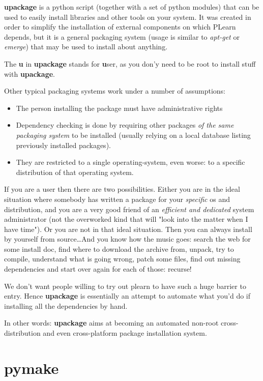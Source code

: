 \documentclass[11pt]{book}
\begin{document}
{\bf upackage} is a python script (together with a set of python modules)
that can be used to easily install libraries and other tools on your
system.  It was created in order to simplify the installation of external
components on which PLearn depends, but it is a general packaging system
(usage is similar to {\em apt-get} or {\em emerge}) that may be used to install
about anything.

The {\bf u} in {\bf upackage} stands for {\bf u}ser, as you don'y need to
  be root to install stuff with {\bf upackage}.

Other typical packaging systems work under a number of assumptions:
\begin{itemize}
\item The person installing the package must have administrative rights
\item Dependency checking is done by requiring other packages \emph{of
  the same packaging system} to be installed (usually relying on a
  local database listing previously installed packages).
\item They are restricted to a single operating-system, even worse: to a specific
  distribution of that operating system. 
\end{itemize}

If you are a user then there are two possibilities. Either you are in the
ideal situation where somebody has written a package for your {\em
specific} os and distribution, and you are a very good friend of an {\em
efficient and dedicated} system administrator (not the overworked kind that
will "look into the matter when I have time"). Or you are not in
that ideal situation. Then you can always install by yourself from
source\ldots And you know how the music goes: search the web for some
install doc, find where to download the archive from, unpack, try to
compile, understand what is going wrong, patch some files, find out missing
dependencies and start over again for each of those: recurse!

We don't want people willing to try out plearn to have such a huge barrier to
entry. Hence {\bf upackage} is essentially an attempt to automate what
you'd do if installing all the dependencies by hand.

In other words: {\bf upackage} aims at becoming an automated non-root
cross-distribution and even cross-platform package installation system.


\section{pymake}
\end{document}

